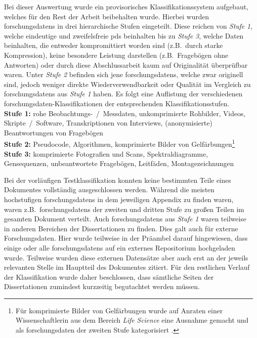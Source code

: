 Bei dieser Auswertung wurde ein provisorisches Klassifikationssystem aufgebaut, welches für den Rest der Arbeit beibehalten wurde.
Hierbei wurden \glspl{forschungsdaten} in drei hierarchische Stufen eingeteilt.
Diese reichen von \textit{Stufe 1}, welche eindeutige und zweifelsfreie \glspl{pd} beinhalten bis zu \textit{Stufe 3}, welche Daten beinhalten, die entweder kompromittiert worden sind (z.B.~durch starke Kompression), keine besondere Leistung darstellen (z.B.~Fragebögen ohne Antworten) oder durch diese Abschlussarbeit kaum auf Originalität überprüfbar waren.
Unter \textit{Stufe 2} befinden sich jene \glspl{forschungsdaten}, welche zwar originell sind, jedoch weniger direkte Wiederverwendbarkeit oder Qualität im Vergleich zu \glspl{forschungsdaten} aus \textit{Stufe 1} haben.
Es folgt eine Auflistung der verschiedenen \gls{forschungsdaten}-Klassifikationen der entsprechenden Klassifikationsstufen.\\
\textbf{Stufe 1:} rohe Beobachtungs-~/~Messdaten, unkomprimierte Rohbilder, Videos, Skripte~/~Software, Transkriptionen von Interviews, (anonymisierte) Beantwortungen von Fragebögen\\
\textbf{Stufe 2:} Pseudocode, Algorithmen, komprimierte Bilder von Gelfärbungen\footnote{Für komprimierte Bilder von Gelfärbungen wurde auf Anraten einer Wissenschaftlerin aus dem Bereich \textit{Life Science} eine Ausnahme gemacht und als \gls{forschungsdaten} der zweiten Stufe kategorisiert \autocite{SarahPC}.}\\
\textbf{Stufe 3:} komprimierte Fotografien und Scans, Spektraldiagramme, Gensequenzen, unbeantwortete Fragebögen, Leitfäden, Montagezeichnungen

Bei der vorläufigen Testklassifikation konnten keine bestimmten Teile eines Dokumentes vollständig ausgeschlossen werden.
Während die meisten hochstufigen \glspl{forschungsdaten} in dem jeweiligen Appendix zu finden waren, waren z.B.~\glspl{forschungsdaten} der zweiten und dritten Stufe zu großen Teilen im gesamten Dokument verteilt.
Auch \glspl{forschungsdaten} aus \textit{Stufe 1} waren teilweise in anderen Bereichen der Dissertationen zu finden.
Dies galt auch für externe Forschungsdaten.
Hier wurde teilweise in der Präambel darauf hingewiesen, dass einige oder alle \glspl{forschungsdaten} auf ein externes Repositorium hochgeladen wurde.
Teilweise wurden diese externen Datensätze aber auch erst an der jeweils relevanten Stelle im Hauptteil des Dokumentes zitiert.
Für den restlichen Verlauf der Klassifikation wurde daher beschlossen, dass sämtliche Seiten der Dissertationen zumindest kurzzeitig begutachtet werden müssen.

